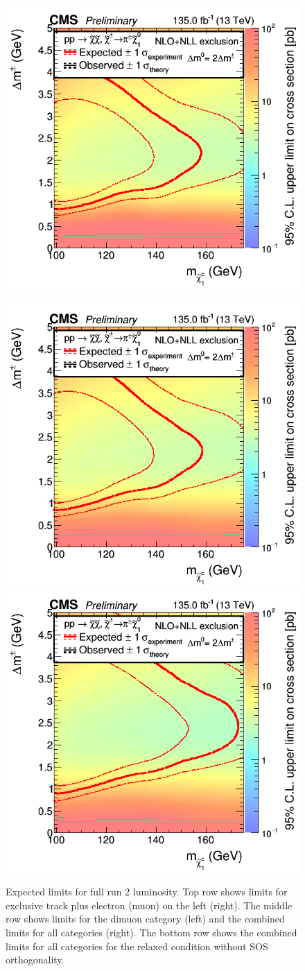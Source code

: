 \begin{figure}[!htb]
\includegraphics[width=0.48\linewidth]{plots/limits/expected/PureHiggsino_2lMuonsOrth_ExpectedXSEC.png} \,
\includegraphics[width=0.48\linewidth]{plots/limits/expected/PureHiggsino_SoftPromptRun2_ExpectedXSEC.png} \\

\includegraphics[width=0.48\linewidth]{plots/limits/expected/PureHiggsino_SoftPromptRun2Inc_ExpectedXSEC.png} \\

\caption[Expected limits for full run 2 luminosity]{Expected limits for full run 2 luminosity. Top row shows limits for exclusive track plus electron (muon) on the left (right). The middle row shows limits for the dimuon category (left) and the combined limits for all categories (right). The bottom row shows the combined limits for all categories for the relaxed condition without SOS orthogonality.}
\label{fig:expected_limits}
\end{figure}

